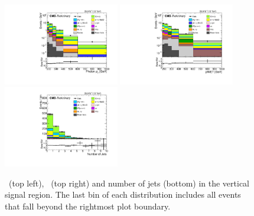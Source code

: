 \begin{figure}[htbp]
  \begin{center}
    \includegraphics[width=0.45\textwidth]{Figures/results/znng_above0p5_phoPt.pdf}
    \includegraphics[width=0.45\textwidth]{Figures/results/znng_above0p5_pfMET.pdf}
    \includegraphics[width=0.45\textwidth]{Figures/results/znng_above0p5_nJet.pdf}
    \caption{
      \ETgamma\ (top left), \MET\ (top right) and number of jets (bottom) in the vertical signal region.
      The last bin of each distribution includes all events that fall beyond the rightmost plot boundary.
    }
    \label{fig:monoph_above0p5}
  \end{center}
\end{figure}


